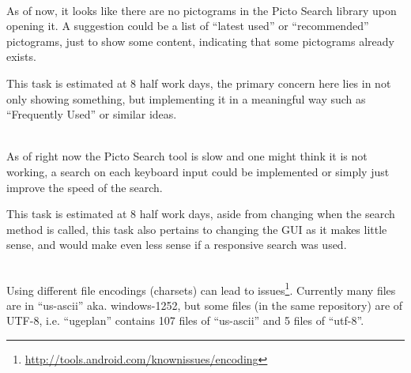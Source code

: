 \begin{description}[style=unboxed]
    \item[Picto Search - It looks like there are no pictograms, until you search for them] \hfill \\ 
        As of now, it looks like there are no pictograms in the Picto Search library upon opening it. 
        A suggestion could be a list of ``latest used'' or ``recommended'' pictograms, just to show some content, indicating that some pictograms already exists.

        This task is estimated at 8 half work days, the primary concern here lies in not only showing something, but implementing it in a meaningful way such as ``Frequently Used'' or similar ideas.
    \item[Picto Search - Responsive Search] \hfill \\
        As of right now the Picto Search tool is slow and one might think it is not working, a search on each keyboard input could be implemented or simply just improve the speed of the search.

        This task is estimated at 8 half work days, aside from changing when the search method is called, this task also pertains to changing the GUI as it makes little sense, and would make even less sense if a responsive search was used. 
    \item[General - Use consistent file encoding] \hfill \\
        Using different file encodings (charsets) can lead to issues\footnote{\url{http://tools.android.com/knownissues/encoding}}. 
        Currently many files are in ``us-ascii'' aka. windows-1252, but some files (in the same repository) are of UTF-8, i.e. ``ugeplan'' contains 107 files of ``us-ascii'' and 5 files of ``utf-8''.    


\end{description}
